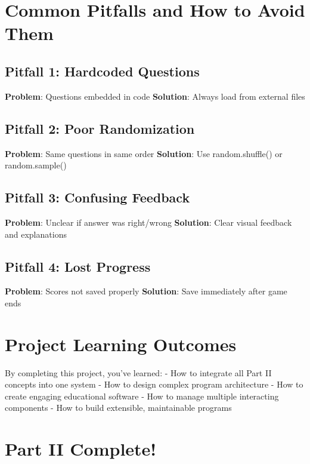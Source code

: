 \documentclass[
  letterpaper,
  DIV=11,
  numbers=noendperiod,
  oneside]{scrreprt}
\begin{document}
\section{Common Pitfalls and How to Avoid
Them}\label{common-pitfalls-and-how-to-avoid-them-7}

\subsection{Pitfall 1: Hardcoded
Questions}\label{pitfall-1-hardcoded-questions}

\textbf{Problem}: Questions embedded in code \textbf{Solution}: Always
load from external files

\subsection{Pitfall 2: Poor
Randomization}\label{pitfall-2-poor-randomization}

\textbf{Problem}: Same questions in same order \textbf{Solution}: Use
random.shuffle() or random.sample()

\subsection{Pitfall 3: Confusing
Feedback}\label{pitfall-3-confusing-feedback}

\textbf{Problem}: Unclear if answer was right/wrong \textbf{Solution}:
Clear visual feedback and explanations

\subsection{Pitfall 4: Lost Progress}\label{pitfall-4-lost-progress}

\textbf{Problem}: Scores not saved properly \textbf{Solution}: Save
immediately after game ends

\section{Project Learning Outcomes}\label{project-learning-outcomes-7}

By completing this project, you've learned: - How to integrate all Part
II concepts into one system - How to design complex program architecture
- How to create engaging educational software - How to manage multiple
interacting components - How to build extensible, maintainable programs

\section{Part II Complete! 🎉}\label{part-ii-complete}
\end{document}

